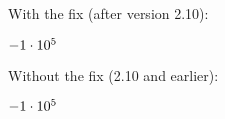 \documentclass[a4paper]{article}
\begin{document}
With the fix (after version 2.10):

$\pgfmathprintnumber{-1e5}$


Without the fix (2.10 and earlier):


$\pgfmathprintnumber{-1e5}$

\end{document}
